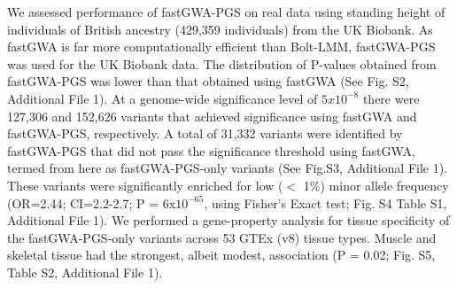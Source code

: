 \documentclass[fleqn,10pt]{wlscirep}
\begin{document}
We assessed performance of fastGWA-PGS on real data using standing height of individuals of British ancestry (429,359 individuals) from the UK Biobank. As fastGWA is far more computationally efficient than Bolt-LMM, fastGWA-PGS was used for the UK Biobank data. The distribution of P-values obtained from fastGWA-PGS was lower than that obtained using fastGWA (See Fig. S2, Additional File 1). At a genome-wide significance level of $5x10^{-8}$ there were 127,306 and 152,626 variants that achieved significance using fastGWA and fastGWA-PGS, respectively. A total of 31,332 variants were identified by fastGWA-PGS that did not pass the significance threshold using fastGWA, termed from here as fastGWA-PGS-only variants (See Fig.S3, Additional File 1).  These variants were significantly enriched for low ($<$ 1\%) minor allele frequency (OR=2.44; CI=2.2-2.7; P = 6x$10^{-65}$, using Fisher’s Exact test; Fig. S4 Table S1, Additional File 1).  We performed a gene-property analysis for tissue specificity of the fastGWA-PGS-only variants across 53 GTEx (v8) tissue types. Muscle and skeletal tissue had the strongest, albeit modest, association (P = 0.02; Fig. S5, Table S2, Additional File 1).  \par
\end{document}

